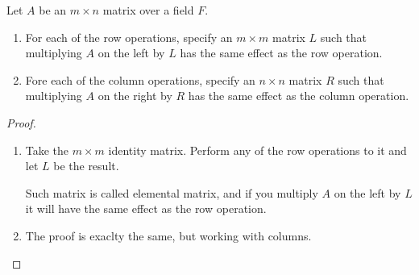 \prob
{
    Let $A$ be an $m \times n$ matrix over a field $F$.
    \begin{enumerate}[label=(\roman*)]
        \item For each of the row operations, specify an $m \times m$ matrix $L$ such that
              multiplying $A$ on the left by $L$ has the same effect as the row operation.\pn
        \item Fore each of the column operations, specify an $n \times n$ matrix $R$ such that multiplying $A$ on the right
                by $R$ has the same effect as the column operation.
    \end{enumerate}
}
\begin{proof}
    \begin{enumerate}
        \item 
        
            Take the $m \times m$ identity matrix. Perform any of the row operations to it and let $L$
            be the result.\pn
        
            Such matrix is called elemental matrix,  and if you multiply $A$ on the left by $L$ it will have the
            same effect as the row operation.
            
        \item
            The proof is exaclty the same, but working with columns.
    \end{enumerate}
\end{proof}
